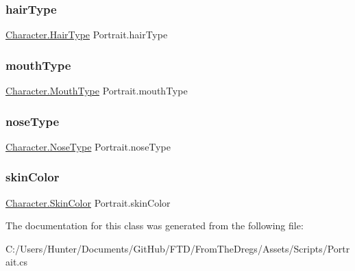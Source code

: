 \mbox{\label{class_portrait_a7fbaf07b4f6d0fe0213e4b812fe90acc}} 
\subsubsection{\texorpdfstring{hairType}{hairType}}
{\footnotesize\ttfamily \mbox{\hyperlink{class_character_ada39ccb0e0be37a8f8f0e9a864eb5733}{Character.\+Hair\+Type}} Portrait.\+hair\+Type\hspace{0.3cm}{\ttfamily [get]}}

\mbox{\label{class_portrait_a9ce977a3c3a8b9790abfaeb57dd16d78}} 
\subsubsection{\texorpdfstring{mouthType}{mouthType}}
{\footnotesize\ttfamily \mbox{\hyperlink{class_character_aaefb65409260b3ad1511951aab1ddd6c}{Character.\+Mouth\+Type}} Portrait.\+mouth\+Type\hspace{0.3cm}{\ttfamily [get]}}

\mbox{\label{class_portrait_a08a64694ad71d1f822acbf63845ae130}} 
\subsubsection{\texorpdfstring{noseType}{noseType}}
{\footnotesize\ttfamily \mbox{\hyperlink{class_character_a638a71f8525dc3a59596f7f4a7836036}{Character.\+Nose\+Type}} Portrait.\+nose\+Type\hspace{0.3cm}{\ttfamily [get]}}

\mbox{\label{class_portrait_ac3ed63c9b306564506b4b96867990f84}} 
\subsubsection{\texorpdfstring{skinColor}{skinColor}}
{\footnotesize\ttfamily \mbox{\hyperlink{class_character_a726214a0fe480fffada7772697764824}{Character.\+Skin\+Color}} Portrait.\+skin\+Color\hspace{0.3cm}{\ttfamily [get]}}



The documentation for this class was generated from the following file\+:\begin{DoxyCompactItemize}
\item 
C\+:/\+Users/\+Hunter/\+Documents/\+Git\+Hub/\+F\+T\+D/\+From\+The\+Dregs/\+Assets/\+Scripts/Portrait.\+cs\end{DoxyCompactItemize}
